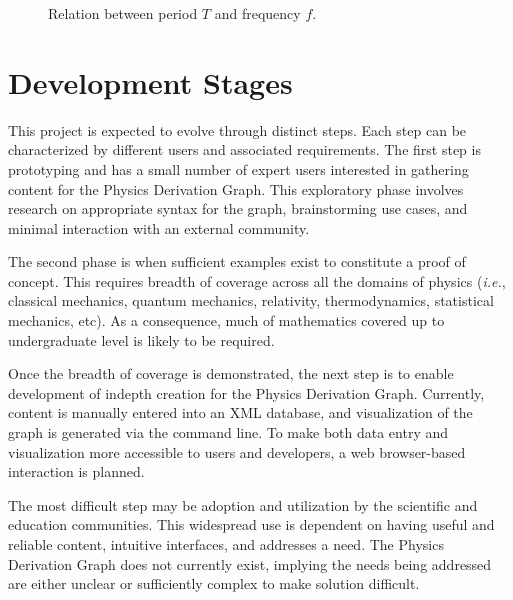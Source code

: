 \documentclass{article}
\newcommand{\ie}{\textit{i.e.}} %
\begin{document}
\begin{multicols}{2}
\begin{center}
\begin{figure}
\caption{Relation between period $T$ and frequency $f$.\label{fig:freq_period}}
\end{figure}
\end{center}
\section{Development Stages}

This project is expected to evolve through distinct steps. Each step can be characterized by different users and associated requirements. 
The first step is prototyping and has a small number of expert users interested in gathering content for the Physics Derivation Graph. This exploratory phase involves research on appropriate syntax for the graph, brainstorming use cases, and minimal interaction with an external community. 

The second phase is when sufficient examples exist to constitute a proof of concept. This requires breadth of coverage across all the domains of physics (\ie, classical mechanics, quantum mechanics, relativity, thermodynamics, statistical mechanics, etc). As a consequence, much of mathematics covered up to undergraduate level is likely to be required. 

Once the breadth of coverage is demonstrated, the next step is to enable development of indepth creation for the Physics Derivation Graph. Currently, content is manually entered into an XML database, and visualization of the graph is generated via the command line. To make both data entry and visualization more accessible to users and developers, a web browser-based interaction is planned. 

The most difficult step may be adoption and utilization by the scientific and education communities. This widespread use is dependent on having useful and reliable content, intuitive interfaces, and addresses a need. The Physics Derivation Graph does not currently exist, implying the needs being addressed are either unclear or sufficiently complex to make solution difficult. 


\end{multicols}
\end{document}
